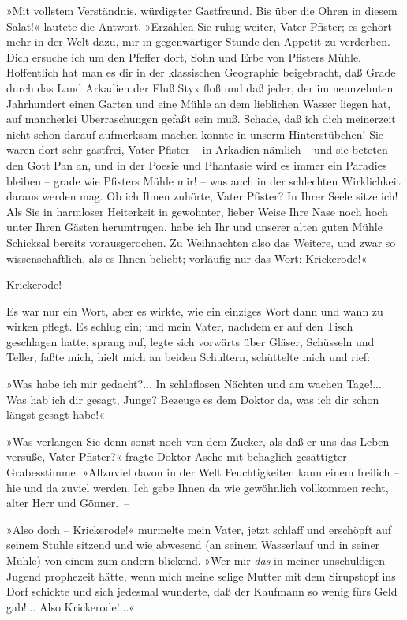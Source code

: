 »Mit vollstem Verständnis, würdigster Gastfreund. Bis über die
Ohren in diesem Salat!« lautete die Antwort. »Erzählen Sie ruhig
weiter, Vater Pfister; es gehört mehr in der Welt dazu, mir in
gegenwärtiger Stunde den Appetit zu verderben. Dich ersuche ich um
den Pfeffer dort, Sohn und Erbe von Pfisters Mühle. Hoffentlich hat
man es dir in der klassischen Geographie beigebracht, daß Grade
durch das Land Arkadien der Fluß Styx floß und daß jeder, der im
neunzehnten Jahrhundert einen Garten und eine Mühle an dem
lieblichen Wasser liegen hat, auf mancherlei Überraschungen gefaßt
sein muß. Schade, daß ich dich meinerzeit nicht schon darauf
aufmerksam machen konnte in unserm Hinterstübchen! Sie waren dort
sehr gastfrei, Vater Pfister – in Arkadien nämlich – und sie
beteten den Gott Pan an, und in der Poesie und Phantasie wird es
immer ein Paradies bleiben – grade wie Pfisters Mühle mir! – was
auch in der schlechten Wirklichkeit daraus werden mag. Ob ich Ihnen
zuhörte, Vater Pfister? In Ihrer Seele sitze ich! Als Sie in
harmloser Heiterkeit in gewohnter, lieber Weise Ihre Nase noch hoch
unter Ihren Gästen herumtrugen, habe ich Ihr und unserer alten
guten Mühle Schicksal bereits vorausgerochen. Zu Weihnachten also
das Weitere, und zwar so wissenschaftlich, als es Ihnen beliebt;
vorläufig nur das Wort: Krickerode!«

Krickerode!

Es war nur ein Wort, aber es wirkte, wie ein einziges Wort dann und
wann zu wirken pflegt. Es schlug ein; und mein Vater, nachdem er
auf den Tisch geschlagen hatte, sprang auf, legte sich vorwärts
über Gläser, Schüsseln und Teller, faßte mich, hielt mich an beiden
Schultern, schüttelte mich und rief:

»Was habe ich mir gedacht?... In schlaflosen Nächten und am wachen
Tage!... Was hab ich dir gesagt, Junge? Bezeuge es dem Doktor da,
was ich dir schon längst gesagt habe!«

»Was verlangen Sie denn sonst noch von dem Zucker, als daß er uns
das Leben versüße, Vater Pfister?« fragte Doktor Asche mit
behaglich gesättigter Grabesstimme. »Allzuviel davon in der Welt
Feuchtigkeiten kann einem freilich – hie und da zuviel werden. Ich
gebe Ihnen da wie gewöhnlich vollkommen recht, alter Herr und
Gönner.~–

»Also doch – Krickerode!« murmelte mein Vater, jetzt schlaff und
erschöpft auf seinem Stuhle sitzend und wie abwesend (an seinem
Wasserlauf und in seiner Mühle) von einem zum andern blickend. »Wer
mir \emph{das} in meiner unschuldigen Jugend prophezeit hätte, wenn
mich meine selige Mutter mit dem Sirupstopf ins Dorf schickte und
sich jedesmal wunderte, daß der Kaufmann so wenig fürs Geld gab!...
Also Krickerode!...«

